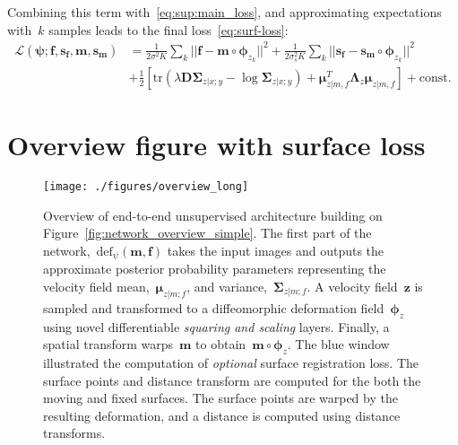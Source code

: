 \documentclass{article}
\newcommand{\bD}{\boldsymbol{D}}
\newcommand{\bs}{\boldsymbol{s}}
\newcommand{\bmu}{\boldsymbol{\mu}}
\newcommand{\bphi}{\boldsymbol{\phi}}
\newcommand{\bpsi}{\boldsymbol{\psi}}
\newcommand{\bSigma}{\boldsymbol{\Sigma}}
\newcommand{\bLambda}{\boldsymbol{\Lambda}}
\newcommand{\bz}{\boldsymbol{z}}
\newcommand{\bmoving}{\boldsymbol{m}}
\newcommand{\bfixed}{\boldsymbol{f}}
\newcommand{\moving}{m}
\newcommand{\fixed}{f}
\begin{document}
Combining this term with~\eqref{eq:sup:main_loss}, and approximating expectations with~$k$ samples leads to the final loss~\eqref{eq:surf-loss}:
\begin{align}
\mathcal{L}(\bpsi; \bfixed, \bs_{\bfixed}, \bmoving, \bs_{\bmoving})  
&= \frac{1}{2\sigma^2K} \sum_k ||\bfixed - \bmoving \circ \bphi_{z_k}||^2  + \frac{1}{2\sigma_s^2K} \sum_k ||\bs_{\bfixed} - \bs_{\bmoving} \circ \bphi_{z_k}||^2 \nonumber \\
&+ \frac{1}{2} \left[ \text{tr}(\lambda\bD \bSigma_{z|x;y} - \log\bSigma_{z|x;y}) + \bmu_{z | \moving, \fixed}^T \bLambda_z \bmu_{z | \moving, \fixed} \right] + \text{const}.
\end{align}


\clearpage
\section*{Overview figure with surface loss}


\begin{figure*}[h!]
	\centering
	\begin{center}
		\texttt{[image: ./figures/overview\_long]}
	\end{center}
	\hfill
	\vspace{-0.75cm}
	\begin{minipage}[b]{1\linewidth}
		\caption{ Overview of end-to-end unsupervised architecture building on Figure~\ref{fig:network_overview_simple}. The first part of the network,~$\text{def}_{\psi}(\bmoving, \bfixed)$ takes the input images and outputs the approximate posterior probability parameters representing the velocity field mean,~$\bmu_{z|\moving;\fixed}$, and variance,~$\bSigma_{z|\moving;\fixed}$. A velocity field~$\bz$ is sampled and transformed to a diffeomorphic deformation field~$\bphi_z$ using novel differentiable \textit{squaring and scaling} layers. Finally, a spatial transform warps~$\bmoving$ to obtain~$\bmoving \circ \bphi_z$. The blue window illustrated the computation of \textit{optional} surface registration loss. The surface points and distance transform are computed for the both the moving and fixed surfaces. The surface points are warped by the resulting deformation, and a distance is computed using distance transforms.
		}
		\label{fig:sup:network_overview_simple}
	\end{minipage}
\end{figure*}
\end{document}
